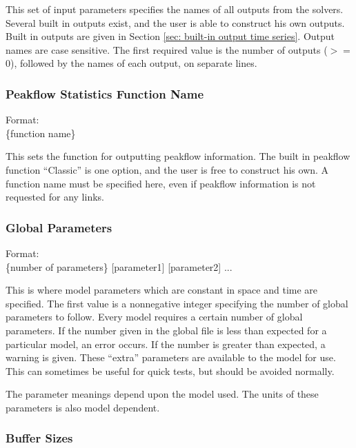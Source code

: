 \documentclass[12pt]{article}
\newenvironment{codeindent}
{\begin{list}{}
        {\setlength{\leftmargin}{.1in}}
        \item[]
}
{\end{list}}
\begin{document}
This set of input parameters specifies the names of all outputs from the solvers. Several built in outputs exist, and the user is able to construct his own outputs. Built in outputs are given in Section \ref{sec: built-in output time series}. Output names are case sensitive. The first required value is the number of outputs ($>=$ 0), followed by the names of each output, on separate lines.


\subsubsection{Peakflow Statistics Function Name} \label{sec: peakflow statistics function name}

\begin{codeindent}
 Format: \\
 \{function name\}
\end{codeindent}

This sets the function for outputting peakflow information. The built in peakflow function ``Classic'' is one option, and the user is free to construct his own. A function name must be specified here, even if peakflow information is not requested for any links.


\subsubsection{Global Parameters} \label{sec: global parameters}

\begin{codeindent}
 Format: \\
 \{number of parameters\} [parameter1] [parameter2] ...
\end{codeindent}

This is where model parameters which are constant in space and time are specified. The first value is a nonnegative integer specifying the number of global parameters to follow. Every model requires a certain number of global parameters. If the number given in the global file is less than expected for a particular model, an error occurs. If the number is greater than expected, a warning is given. These ``extra'' parameters are available to the model for use. This can sometimes be useful for quick tests, but should be avoided normally.

The parameter meanings depend upon the model used. The units of these parameters is also model dependent.

\subsubsection{Buffer Sizes} \label{sec: buffer sizes}
\end{document}
